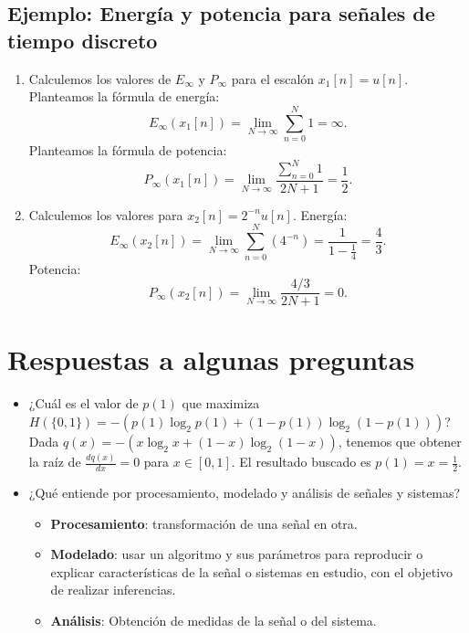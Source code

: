 \subsection{Ejemplo: Energía y potencia para señales de tiempo discreto}

\begin{enumerate}
	\item Calculemos los valores de $E_{\infty }$ y $P_{\infty }$ para el escalón $x_{1}[n]=u[n]$.
	Planteamos la fórmula de energía:
	\begin{equation}
		E_{\infty }(x_{1}[n]) = \lim_{N \rightarrow \infty} \sum_{n=0}^{N} 1 = \infty.
	\end{equation}
	Planteamos la fórmula de potencia:
	\begin{equation}
		P_{\infty }(x_{1}[n]) = \lim_{N \rightarrow \infty} \frac{\sum_{n=0}^{N} 1}{2N+1} = \frac{1}{2}.
	\end{equation}
	
	\item Calculemos los valores para $x_{2}[n] = 2^{-n}u[n]$.
	Energía:
	\begin{equation}
		E_{\infty }(x_{2}[n]) = \lim_{N \rightarrow \infty} \sum_{n=0}^{N} \left(4^{-n}\right) = \frac{1}{1-\frac{1}{4}} = \frac{4}{3}.
	\end{equation}
	Potencia:
	\begin{equation}
		P_{\infty }(x_{2}[n]) = \lim_{N \rightarrow \infty} \frac{4/3}{2N+1} = 0.
	\end{equation}
\end{enumerate}

\section{Respuestas a algunas preguntas}

\begin{itemize}
	\item ¿Cuál es el valor de $p(1)$ que maximiza $H(\{0,1\}) = - (p(1) \log_{2} p(1) + (1 - p(1)) \log_{2} (1 - p(1)))$?
	Dada $q(x) = - (x \log_{2} x + (1 - x) \log_{2} (1 - x))$, tenemos que obtener la raíz de $\frac{d q(x)}{d x} = 0$ para $x \in [0, 1]$. El resultado buscado es $p(1) = x = \frac{1}{2}$.
	
	\item ¿Qué entiende por procesamiento, modelado y análisis de señales y sistemas?
	\begin{itemize}
		\item \textbf{Procesamiento}: transformación de una señal en otra.
		\item \textbf{Modelado}: usar un algoritmo y sus parámetros para reproducir o explicar características de la señal o sistemas en estudio, con el objetivo de realizar inferencias.
		\item \textbf{Análisis}: Obtención de medidas de la señal o del sistema.
	\end{itemize}
\end{itemize}
